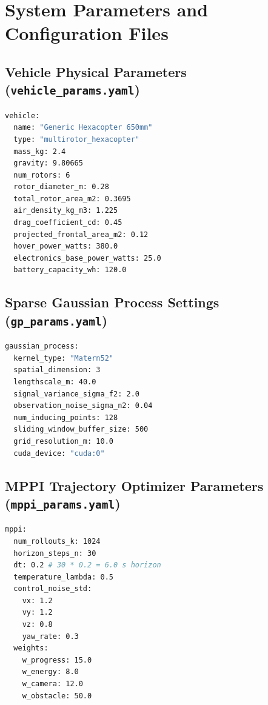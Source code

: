 \documentclass[12pt,a4paper,oneside]{report}
\begin{document}
\appendix
\chapter{System Parameters and Configuration Files}

\section{Vehicle Physical Parameters (\texttt{vehicle\_params.yaml})}
\begin{lstlisting}[language=bash]
vehicle:
  name: "Generic Hexacopter 650mm"
  type: "multirotor_hexacopter"
  mass_kg: 2.4
  gravity: 9.80665
  num_rotors: 6
  rotor_diameter_m: 0.28
  total_rotor_area_m2: 0.3695
  air_density_kg_m3: 1.225
  drag_coefficient_cd: 0.45
  projected_frontal_area_m2: 0.12
  hover_power_watts: 380.0
  electronics_base_power_watts: 25.0
  battery_capacity_wh: 120.0
\end{lstlisting}

\section{Sparse Gaussian Process Settings (\texttt{gp\_params.yaml})}
\begin{lstlisting}[language=bash]
gaussian_process:
  kernel_type: "Matern52"
  spatial_dimension: 3
  lengthscale_m: 40.0
  signal_variance_sigma_f2: 2.0
  observation_noise_sigma_n2: 0.04
  num_inducing_points: 128
  sliding_window_buffer_size: 500
  grid_resolution_m: 10.0
  cuda_device: "cuda:0"
\end{lstlisting}

\section{MPPI Trajectory Optimizer Parameters (\texttt{mppi\_params.yaml})}
\begin{lstlisting}[language=bash]
mppi:
  num_rollouts_k: 1024
  horizon_steps_n: 30
  dt: 0.2 # 30 * 0.2 = 6.0 s horizon
  temperature_lambda: 0.5
  control_noise_std:
    vx: 1.2
    vy: 1.2
    vz: 0.8
    yaw_rate: 0.3
  weights:
    w_progress: 15.0
    w_energy: 8.0
    w_camera: 12.0
    w_obstacle: 50.0
\end{lstlisting}
\end{document}
